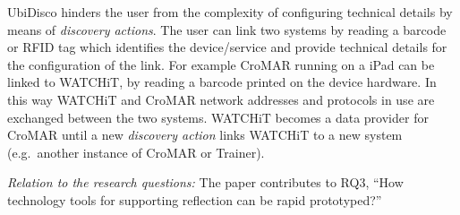 UbiDisco hinders the user from the complexity of configuring technical
details by means of \emph{discovery actions}. The user can link two
systems by reading a barcode or RFID tag which identifies the
device/service and provide technical details for the configuration of
the link. For example CroMAR running on a iPad can be linked to WATCHiT,
by reading a barcode printed on the device hardware. In this way WATCHiT
and CroMAR network addresses and protocols in use are exchanged between
the two systems. WATCHiT becomes a data provider for CroMAR until a new
\emph{discovery action} links WATCHiT to a new system (e.g.~another
instance of CroMAR or Trainer).

\emph{Relation to the research questions: } The paper contributes to
RQ3, ``How technology tools for supporting reflection can be rapid
prototyped?''
